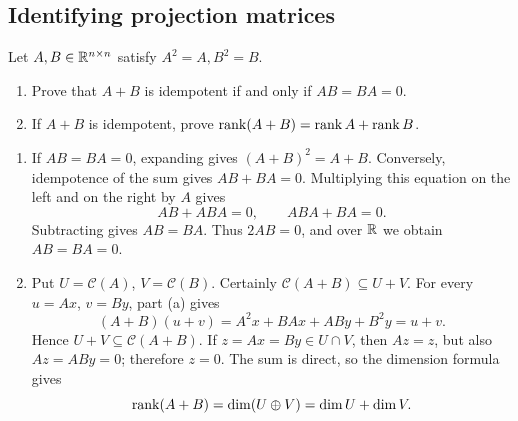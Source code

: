 \subsection*{Identifying projection matrices}

\begin{problem}\label{ex:06:idempotent-sum}
Let \(A,B\in\mathbb R^{n\times n}\) satisfy \(A^2=A,B^2=B\).
\begin{enumerate}
\item Prove that \(A+B\) is idempotent if and only if \(AB=BA=0\).
\item If \(A+B\) is idempotent, prove
\(\operatorname{rank}(A+B)=\operatorname{rank} A+\operatorname{rank} B\).
\end{enumerate}
\end{problem}
\begin{solution}
\begin{enumerate}
\item If \(AB=BA=0\), expanding gives \((A+B)^2=A+B\).
Conversely, idempotence of the sum gives \(AB+BA=0\).
Multiplying this equation on the left and on the right by \(A\) gives
\[
AB+ABA=0,\qquad ABA+BA=0.
\]
Subtracting gives \(AB=BA\). Thus \(2AB=0\), and over \(\mathbb R\)
we obtain \(AB=BA=0\).
\item Put \(U=\mathcal C(A)\), \(V=\mathcal C(B)\).
Certainly \(\mathcal C(A+B)\subseteq U+V\).
For every \(u=Ax\), \(v=By\), part (a) gives
\[
(A+B)(u+v)=A^2x+BAx+ABy+B^2y=u+v.
\]
Hence \(U+V\subseteq\mathcal C(A+B)\).
If \(z=Ax=By\in U\cap V\), then \(Az=z\), but also \(Az=ABy=0\);
therefore \(z=0\).
The sum is direct, so the dimension formula gives
\[
\operatorname{rank}(A+B)=\dim(U\oplus V)=\dim U+\dim V.
\]
\end{enumerate}
\end{solution}

